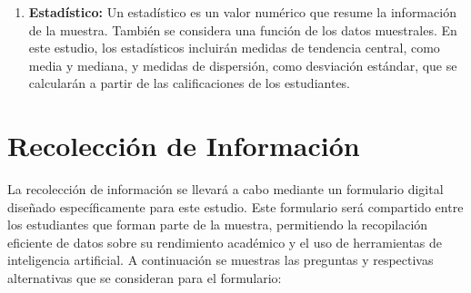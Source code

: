\documentclass{article}
\newenvironment{terminosEstadisticos}{}{}
\newenvironment{recoleccionDeInformacion}{}{}
\begin{document}
\begin{terminosEstadisticos}
\begin{enumerate}
    \item \textbf{Estadístico:} Un estadístico es un valor numérico que resume la información de la muestra. También se considera una función de los datos muestrales. En este estudio, los estadísticos incluirán medidas de tendencia central, como media y mediana, y medidas de dispersión, como desviación estándar, que se calcularán a partir de las calificaciones de los estudiantes.
  \end{enumerate}
\end{terminosEstadisticos}

\newpage

\begin{recoleccionDeInformacion}
  \section{Recolección de Información}

  La recolección de información se llevará a cabo mediante un formulario digital diseñado específicamente para este estudio. Este formulario será compartido entre los estudiantes que forman parte de la muestra, permitiendo la recopilación eficiente de datos sobre su rendimiento académico y el uso de herramientas de inteligencia artificial. A continuación se muestras las preguntas y respectivas alternativas que se consideran para el formulario:
  

\end{recoleccionDeInformacion}
\end{document}
